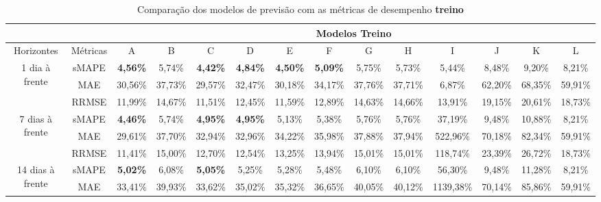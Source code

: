 \begin{landscape}
	
	\begin{table}[!htpb]
	\centering
	\caption{Comparação dos modelos de previsão com as métricas de desempenho \textbf{treino}}\label{tb:apd-trn}
	\begin{tabular}{@{}cccccccccccccc@{}}
		\toprule
		&          & \multicolumn{12}{c}{Modelos Treino}                                                                                                                             \\ \midrule
		Horizontes                        & Métricas & A               & B       & C               & D               & E               & F               & G       & H       & I         & J       & K       & L       \\
		\multirow{3}{*}{1 dia à frente}   & sMAPE    & \textbf{4,56\%} & 5,74\%  & \textbf{4,42\%} & \textbf{4,84\%} & \textbf{4,50\%} & \textbf{5,09\%} & 5,75\%  & 5,73\%  & 5,44\%    & 8,48\%  & 9,20\%  & 8,21\%  \\
		& MAE      & 30,56\%         & 37,73\% & 29,57\%         & 32,47\%         & 30,18\%         & 34,17\%         & 37,76\% & 37,71\% & 6,87\%    & 62,20\% & 68,35\% & 59,91\% \\
		& RRMSE    & 11,99\%         & 14,67\% & 11,51\%         & 12,45\%         & 11,59\%         & 12,89\%         & 14,63\% & 14,66\% & 13,91\%   & 19,15\% & 20,61\% & 18,73\% \\ \midrule
		\multirow{3}{*}{7 dias à frente}  & sMAPE    & \textbf{4,46\%} & 5,74\%  & \textbf{4,95\%} & \textbf{4,95\%} & 5,13\%          & 5,38\%          & 5,76\%  & 5,76\%  & 37,19\%   & 9,48\%  & 10,88\% & 8,21\%  \\
		& MAE      & 29,61\%         & 37,70\% & 32,94\%         & 32,96\%         & 34,22\%         & 35,98\%         & 37,88\% & 37,94\% & 522,96\%  & 70,18\% & 82,34\% & 59,91\% \\
		& RRMSE    & 11,41\%         & 15,00\% & 12,70\%         & 12,54\%         & 13,25\%         & 13,94\%         & 15,01\% & 15,01\% & 118,74\%  & 23,39\% & 26,72\% & 18,73\% \\ \midrule
		\multirow{3}{*}{14 dias à frente} & sMAPE    & \textbf{5,02\%} & 6,08\%  & \textbf{5,05\%} & 5,25\%          & 5,28\%          & 5,48\%          & 6,10\%  & 6,10\%  & 56,30\%   & 9,48\%  & 11,28\% & 8,21\%  \\
		& MAE      & 33,41\%         & 39,93\% & 33,62\%         & 35,02\%         & 35,32\%         & 36,65\%         & 40,05\% & 40,12\% & 1139,38\% & 70,14\% & 85,86\% & 59,91\% \\

\end{tabular}
\end{table}
\end{landscape}
